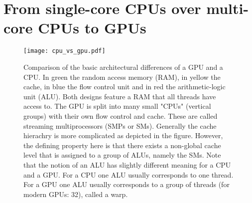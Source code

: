 \section{From single-core CPUs over multi-core CPUs to GPUs}

\begin{figure} \label{fig_tree_reduction}
    \centering
    \texttt{[image: cpu\_vs\_gpu.pdf]}
    \caption{
        Comparison of the basic architectural differences of a GPU and a CPU.
        In green the random access memory (RAM), in yellow the cache, in blue the flow control unit and in red the arithmetic-logic unit (ALU).
        Both designs feature a RAM that all threads have access to.
        The GPU is split into many small "CPUs" (vertical groups) with their own flow control and cache.
        These are called streaming multiprocessors (SMPs or SMs).
        Generally the cache hierachry is more complicated as depicted in the figure.
        However, the defining property here is that there exists a non-global cache level that is assigned to a group of ALUs, namely the SMs. 
        Note that the notion of an ALU has slightly different meaning for a CPU and a GPU.
        For a CPU one ALU usually corresponds to one thread.
        For a GPU one ALU usually corresponds to a group of threads (for modern GPUs: 32), called a warp.
    }
\end{figure}

